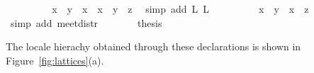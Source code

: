 \begin{isabellebody}
\ \ \ \ \isamarkupfalse%
\ \isamarkupfalse%
\ {\isachardoublequoteopen}{\isachardot}{\isachardot}{\isachardot}\ {\isacharequal}\ {\isacharparenleft}{\isacharparenleft}x\ {\isasymsqunion}\ y{\isacharparenright}\ {\isasymsqinter}\ x{\isacharparenright}\ {\isasymsqunion}\ {\isacharparenleft}{\isacharparenleft}x\ {\isasymsqunion}\ y{\isacharparenright}\ {\isasymsqinter}\ z{\isacharparenright}{\isachardoublequoteclose}\ \isamarkupfalse%
\ {\isacharparenleft}simp\ add{\isacharcolon}\ L{}\ L{}{\isacharparenright}\isanewline
\ \ \ \ \isamarkupfalse%
\ \isamarkupfalse%
\ {\isachardoublequoteopen}{\isachardot}{\isachardot}{\isachardot}\ {\isacharequal}\ {\isacharparenleft}x\ {\isasymsqunion}\ y{\isacharparenright}\ {\isasymsqinter}\ {\isacharparenleft}x\ {\isasymsqunion}\ z{\isacharparenright}{\isachardoublequoteclose}\ \isamarkupfalse%
\ {\isacharparenleft}simp\ add{\isacharcolon}\ meet{\isacharunderscore}distr{\isacharparenright}\isanewline
\ \ \ \ \isamarkupfalse%
\ \isamarkupfalse%
\ {\isacharquery}thesis\ \isacommand{{\isachardot}}\isamarkupfalse%
\isanewline
\ \ \isamarkupfalse%
%
\endisatagproof
{\isafoldproof}%
%
\isadelimproof
%
\endisadelimproof
%
\begin{isamarkuptext}%
The locale hierachy obtained through these declarations is shown in Figure~\ref{fig:lattices}(a).


\end{isamarkuptext}
\end{isabellebody}
